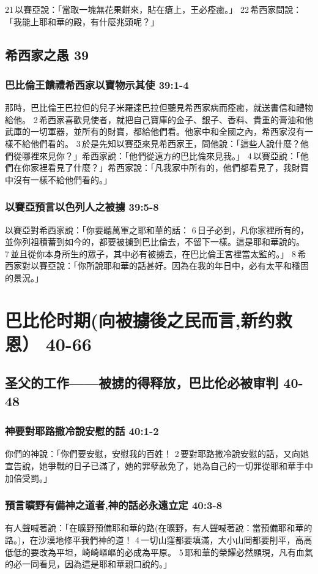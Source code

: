 21 以賽亞說：「當取一塊無花果餅來，貼在瘡上，王必痊癒。」 22 希西家問說：「我能上耶和華的殿，有什麼兆頭呢？」


\subsection{希西家之愚 39}
\subsubsection{巴比倫王饋禮希西家以寶物示其使 39:1-4}
那時，巴比倫王巴拉但的兒子米羅達巴拉但聽見希西家病而痊癒，就送書信和禮物給他。 2 希西家喜歡見使者，就把自己寶庫的金子、銀子、香料、貴重的膏油和他武庫的一切軍器，並所有的財寶，都給他們看。他家中和全國之內，希西家沒有一樣不給他們看的。 3 於是先知以賽亞來見希西家王，問他說：「這些人說什麼？他們從哪裡來見你？」希西家說：「他們從遠方的巴比倫來見我。」 4 以賽亞說：「他們在你家裡看見了什麼？」希西家說：「凡我家中所有的，他們都看見了，我財寶中沒有一樣不給他們看的。」

\subsubsection{以賽亞預言以色列人之被擄 39:5-8}
以賽亞對希西家說：「你要聽萬軍之耶和華的話： 6 日子必到，凡你家裡所有的，並你列祖積蓄到如今的，都要被擄到巴比倫去，不留下一樣。這是耶和華說的。 7 並且從你本身所生的眾子，其中必有被擄去，在巴比倫王宮裡當太監的。」 8 希西家對以賽亞說：「你所說耶和華的話甚好。因為在我的年日中，必有太平和穩固的景況。」

\section{巴比伦时期(向被擄後之民而言,新约救恩） 40-66}
\subsection{圣父的工作——被掳的得释放，巴比伦必被审判 40-48}
\subsubsection{神要對耶路撒冷說安慰的話 40:1-2}
你們的神說：「你們要安慰，安慰我的百姓！ 2 要對耶路撒冷說安慰的話，又向她宣告說，她爭戰的日子已滿了，她的罪孽赦免了，她為自己的一切罪從耶和華手中加倍受罰。」

\subsubsection{預言曠野有備神之道者,神的話必永遠立定 40:3-8}
有人聲喊著說：「在曠野預備耶和華的路(在曠野，有人聲喊著說：當預備耶和華的路。)，在沙漠地修平我們神的道！ 4 一切山窪都要填滿，大小山岡都要削平，高高低低的要改為平坦，崎崎嶇嶇的必成為平原。 5 耶和華的榮耀必然顯現，凡有血氣的必一同看見，因為這是耶和華親口說的。」

